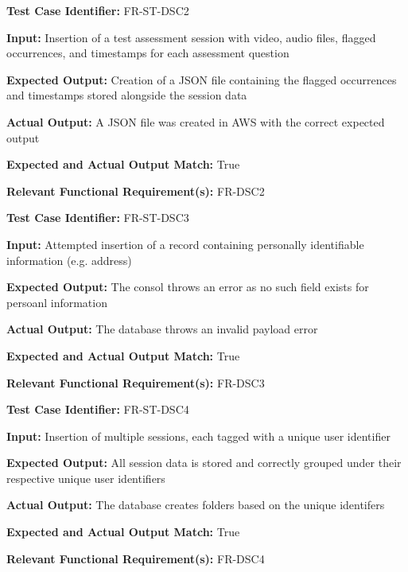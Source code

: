 \documentclass[12pt, titlepage]{article}
\begin{document}
\begin{mdframed}[linewidth=0.5mm] \par
  \textbf{Test Case Identifier:} FR-ST-DSC2 \par
  \textbf{Input:} Insertion of a test assessment session with video, audio files, flagged occurrences, and timestamps for each assessment question \par
  \textbf{Expected Output:} Creation of a JSON file containing the flagged occurrences and timestamps stored alongside the session data \par
  \textbf{Actual Output:} A JSON file was created in AWS with the correct expected output \par
  \textbf{Expected and Actual Output Match:} True \par
  \textbf{Relevant Functional Requirement(s):} FR-DSC2
\end{mdframed}

\begin{mdframed}[linewidth=0.5mm] \par
  \textbf{Test Case Identifier:} FR-ST-DSC3 \par
  \textbf{Input:} Attempted insertion of a record containing personally identifiable information (e.g. address) \par
  \textbf{Expected Output:} The consol throws an error as no such field exists for persoanl information \par
  \textbf{Actual Output:} The database throws an invalid payload error\par
  \textbf{Expected and Actual Output Match:} True \par
  \textbf{Relevant Functional Requirement(s):} FR-DSC3
\end{mdframed}

\begin{mdframed}[linewidth=0.5mm] \par
  \textbf{Test Case Identifier:} FR-ST-DSC4 \par
  \textbf{Input:} Insertion of multiple sessions, each tagged with a unique user identifier \par
  \textbf{Expected Output:} All session data is stored and correctly grouped under their respective unique user identifiers \par
  \textbf{Actual Output:} The database creates folders based on the unique identifers \par
  \textbf{Expected and Actual Output Match:} True \par
  \textbf{Relevant Functional Requirement(s):} FR-DSC4
\end{mdframed}
\end{document}
